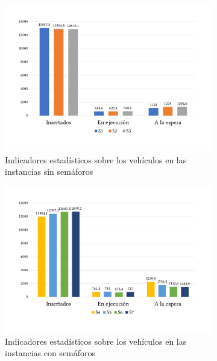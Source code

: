 \begin{figure}[h]
    \centering
    \begin{subfigure}[t]{.49\textwidth}
      \centering
      \includegraphics[width=\textwidth]{report/images/estudio/veh-sin.pdf}
    \caption{Indicadores estadísticos sobre los vehículos en las instancias sin semáforos}
    \end{subfigure}
    \hfill
    \begin{subfigure}[t]{.49\textwidth}
      \centering
      \includegraphics[width=\textwidth]{report/images/estudio/veh-con.pdf}
        \caption{Indicadores estadísticos sobre los vehículos en las instancias con semáforos}
    \end{subfigure}
    \vspace{0.7cm}
    \begin{subfigure}[t]{.49\textwidth}

\end{subfigure}
\end{figure}
